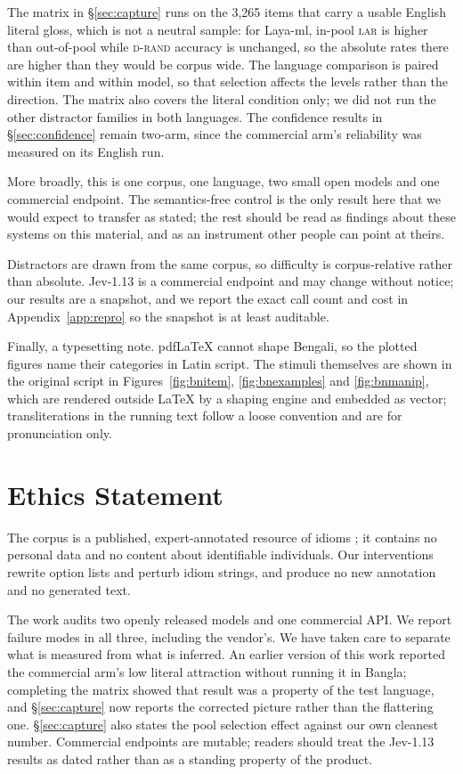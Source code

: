 \documentclass[11pt]{article}
\newcommand{\Drand}{\textsc{d-rand}}
\newcommand{\LAR}{\textsc{lar}}
\begin{document}
The matrix in \S\ref{sec:capture} runs on the 3{,}265 items that carry a
usable English literal gloss, which is not a neutral sample: for Laya-ml,
in-pool \LAR{} is higher than out-of-pool while \Drand{} accuracy is
unchanged, so the absolute rates there are higher than they would be corpus
wide. The language comparison is paired within item and within model, so that
selection affects the levels rather than the direction. The matrix also covers
the literal condition only; we did not run the other distractor families in both
languages. The confidence results in \S\ref{sec:confidence} remain two-arm,
since the commercial arm's reliability was measured on its English run.

More broadly, this is one corpus, one language, two small open models and one
commercial endpoint. The semantics-free control is the only result here that we
would expect to transfer as stated; the rest should be read as findings about
these systems on this material, and as an instrument other people can point at
theirs.

Distractors are drawn from the same corpus, so difficulty is corpus-relative
rather than absolute. Jev-1.13 is a commercial endpoint and may change without
notice; our results are a snapshot, and we report the exact call count and cost
in Appendix~\ref{app:repro} so the snapshot is at least auditable.

Finally, a typesetting note. pdf\LaTeX{} cannot shape Bengali, so the plotted
figures name their categories in Latin script. The stimuli themselves are shown
in the original script in Figures~\ref{fig:bnitem}, \ref{fig:bnexamples} and
\ref{fig:bnmanip}, which are rendered outside \LaTeX{} by a shaping engine and
embedded as vector; transliterations in the running text follow a loose
convention and are for pronunciation only.

\section*{Ethics Statement}

The corpus is a published, expert-annotated resource of idioms \citep{sakhawat-etal-2026-words}; it contains no
personal data and no content about identifiable individuals. Our interventions
rewrite option lists and perturb idiom strings, and produce no new annotation and
no generated text.

The work audits two openly released models and one commercial API. We report
failure modes in all three, including the vendor's. We have taken care to
separate what is measured from what is inferred. An earlier version of this
work reported the commercial arm's low literal attraction without running it in
Bangla; completing the matrix showed that result was a property of the test
language, and \S\ref{sec:capture} now reports the corrected picture rather
than the flattering one. \S\ref{sec:capture} also states the pool selection
effect against our own cleanest number. Commercial endpoints are
mutable; readers should treat the Jev-1.13 results as dated rather than as a
standing property of the product.
\end{document}
